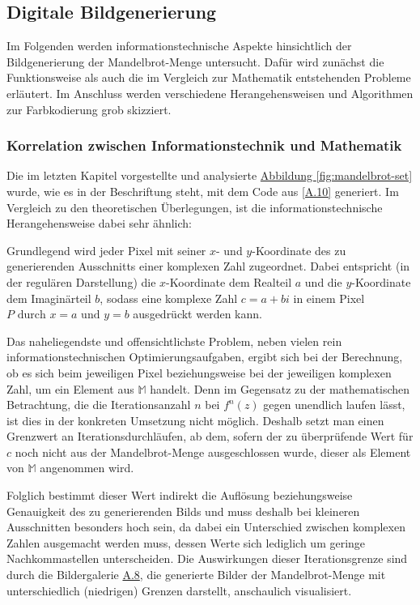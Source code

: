 \subsection{Digitale Bildgenerierung}\label{subsec:digital-generation}

Im Folgenden werden informationstechnische Aspekte hinsichtlich der Bildgenerierung
der Mandelbrot-Menge untersucht.
Dafür wird zunächst die Funktionsweise als auch die im Vergleich zur Mathematik
entstehenden Probleme erläutert.
Im Anschluss werden verschiedene Herangehensweisen und Algorithmen zur Farbkodierung
grob skizziert.

\subsubsection{Korrelation zwischen Informationstechnik und Mathematik}
\label{subsubsec:correlation-between-it-and-mathematics}

Die im letzten Kapitel vorgestellte und analysierte \hyperref[fig:mandelbrot-set]
{Abbildung \ref{fig:mandelbrot-set}} wurde,
wie es in der Beschriftung steht, mit dem Code aus \hyperref[app:10]{[A.10]}
generiert.
Im Vergleich zu den theoretischen Überlegungen, ist die
informationstechnische Herangehensweise dabei sehr ähnlich:

Grundlegend wird jeder Pixel mit seiner $x$- und $y$-Koordinate des zu generierenden
Ausschnitts einer komplexen Zahl zugeordnet.
Dabei entspricht (in der regulären Darstellung) die $x$-Koordinate dem Realteil
$a$ und die $y$-Koordinate dem Imagin\"arteil $b$, sodass eine komplexe Zahl
$c = a + bi$ in einem Pixel $P \text{ durch } x = a \text{ und } y = b$ ausgedrückt
werden kann.

Das naheliegendste und offensichtlichste Problem,
neben vielen rein informationstechnischen Optimierungsaufgaben,
ergibt sich bei der Berechnung, ob es sich beim jeweiligen Pixel
beziehungsweise bei der jeweiligen komplexen Zahl, um ein Element aus
$\mathbb{M}$ handelt.
Denn im Gegensatz zu der mathematischen Betrachtung, die die Iterationsanzahl
$n$ bei $f^n(z)$ gegen unendlich laufen lässt, ist dies in der konkreten Umsetzung
nicht möglich.
Deshalb setzt man einen Grenzwert an Iterationsdurchläufen, ab dem, sofern der zu
überprüfende Wert für $c$ noch nicht aus der Mandelbrot-Menge ausgeschlossen wurde,
dieser als Element von $\mathbb{M}$ angenommen wird.

Folglich bestimmt dieser Wert indirekt die Auflösung beziehungsweise Genauigkeit
des zu generierenden Bilds und muss deshalb bei kleineren Ausschnitten besonders
hoch sein, da dabei ein Unterschied zwischen komplexen Zahlen ausgemacht werden
muss, dessen Werte sich lediglich um geringe Nachkommastellen unterscheiden.
Die Auswirkungen dieser Iterationsgrenze sind durch die Bildergalerie
\hyperref[app:8]{A.8}, die generierte Bilder der Mandelbrot-Menge
mit unterschiedlich (niedrigen) Grenzen darstellt, anschaulich visualisiert.

